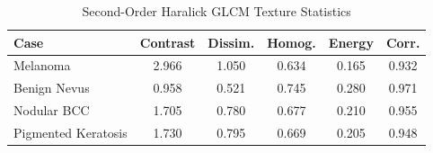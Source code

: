 \documentclass[conference]{IEEEtran}
\begin{document}
\begin{table}[htbp]
\caption{Second-Order Haralick GLCM Texture Statistics}
\label{tab:glcm}
\centering
\setlength{\tabcolsep}{4.5pt}
\renewcommand{\arraystretch}{1.2}
\begin{tabularx}{\columnwidth}{@{}l c c c c c@{}}
\toprule
\textbf{Case} & \textbf{Contrast} & \textbf{Dissim.} & \textbf{Homog.} & \textbf{Energy} & \textbf{Corr.} \\
\midrule
Melanoma & 2.966 & 1.050 & 0.634 & 0.165 & 0.932 \\
Benign Nevus & 0.958 & 0.521 & 0.745 & 0.280 & 0.971 \\
Nodular BCC & 1.705 & 0.780 & 0.677 & 0.210 & 0.955 \\
Pigmented Keratosis & 1.730 & 0.795 & 0.669 & 0.205 & 0.948 \\
\bottomrule
\end{tabularx}
\end{table}
\end{document}
